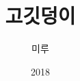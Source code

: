 \documentclass[11pt, b6paper]{memoir}
\author{미루}
\title{고깃덩이}
\date{2018}
\begin{document}
  \frontmatter
  \begin{titlingpage}
    \maketitle
  \end{titlingpage}


  \mainmatter

\appendix
\backmatter
\end{document}
